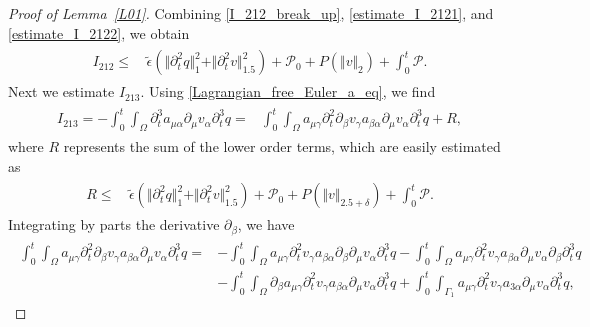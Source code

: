 \documentclass[10pt,reqno]{amsart}
\theoremstyle{plain}
\theoremstyle{definition}
\numberwithin{equation}{section}
\newcommand{\ccP}{\mathscr{P}}
\newcommand{\ccPz}{\mathscr{P}_0}
\newcommand{\al}{\alpha}
\newcommand{\be}{\beta}
\newcommand{\ga}{\gamma}
\newcommand{\Ga}{\Gamma}
\newcommand{\de}{\delta}
\newcommand{\Om}{\Omega}
\newcommand{\norm}[1]{\Vert#1\Vert}
\begin{document}
\begin{proof}[Proof of Lemma~\ref{L01}]
Combining \eqref{I_212_break_up}, \eqref{estimate_I_2121},
and \eqref{estimate_I_2122}, we obtain 
\begin{align}
\begin{split}
I_{212} \leq &
\,
\widetilde{\epsilon}( \norm{\partial^2_t q}^2_1 
+ \norm{\partial^2_t v}^2_{1.5} )
+
\ccPz
+ P(\norm{v}_{2}) 
+ \int_0^t \ccP.
\end{split}
\label{estimate_I_212} 
\end{align}
Next we estimate $I_{213}$. Using \eqref{Lagrangian_free_Euler_a_eq}, we find
\begin{align}
\begin{split}
  I_{213}
=
- \int_0^t \int_\Om \partial^3_t a_{\mu \al} \partial_\mu v_\al\partial^3_t q
= & 
\int_0^t \int_\Om   a_{\mu \ga} \partial^2_t \partial_\be v_\ga a_{\be \al}  \partial_\mu v_\al\partial^3_t q
+ R,
\end{split}
\nonumber
\end{align}
where $R$ 
represents the sum of the lower order terms, which
are
easily
estimated as
\begin{align}
\begin{split}
R \leq & 
\,
\widetilde{\epsilon} (\norm{ \partial^2_t q}^2_1 + \norm{ \partial^2_t v}^2_{1.5} ) 
+
\ccPz
+ P(\norm{v}_{2.5+\de}) + \int_0^t \ccP.
\end{split}
\label{R_term_as_paper}
\end{align}
Integrating by parts the derivative $\partial_\be$, we have
\begin{align}
\begin{split}
\int_0^t \int_\Om   a_{\mu \ga} \partial^2_t \partial_\be v_\ga a_{\be \al}  \partial_\mu v_\al\partial^3_t q 
= &
- \int_0^t \int_\Om   a_{\mu \ga} \partial^2_t  v_\ga a_{\be \al}  \partial_\be\partial_\mu v_\al\partial^3_t q 
- \int_0^t \int_\Om   a_{\mu \ga} \partial^2_t  v_\ga a_{\be \al} \partial_\mu v_\al
 \partial_\be\partial^3_t q
 \\
 & 
 - \int_0^t \int_\Om    \partial_\be a_{\mu \ga} \partial^2_t  v_\ga a_{\be \al} \partial_\mu v_\al
\partial^3_t q
+ \int_0^t \int_{\Ga_1}   a_{\mu \ga} \partial^2_t  v_\ga a_{3 \al}  \partial_\mu v_\al\partial^3_t q,

\end{split}
\end{align}
\end{proof}
\end{document}
